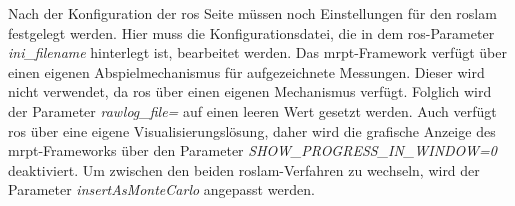 Nach der Konfiguration der \Gls{ros} Seite müssen noch Einstellungen für den \Gls{roslam} festgelegt werden. Hier muss die Konfigurationsdatei, die in dem \Gls{ros}-Parameter \textit{ini\_filename} hinterlegt ist, bearbeitet werden. Das \Gls{mrpt}-Framework verfügt über einen eigenen Abspielmechanismus für aufgezeichnete Messungen. Dieser wird nicht verwendet, da \Gls{ros} über einen eigenen Mechanismus verfügt. Folglich wird der Parameter \textit{rawlog\_file=} auf einen leeren Wert gesetzt werden. Auch verfügt \Gls{ros} über eine eigene Visualisierungslösung, daher wird die grafische Anzeige des \Gls{mrpt}-Frameworks über den Parameter \textit{SHOW\_PROGRESS\_IN\_WINDOW=0} deaktiviert. Um zwischen den beiden \Gls{roslam}-Verfahren zu wechseln, wird der Parameter \textit{insertAsMonteCarlo} angepasst werden.

